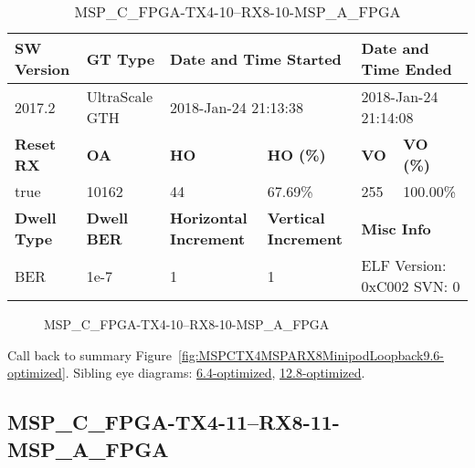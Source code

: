 \begin{table}[h]
\centering
\caption{MSP\_C\_FPGA-TX4-10--RX8-10-MSP\_A\_FPGA}
\label{tab:MSPCFPGATX410RX810MSPAFPGA9.6-optimized}
\begin{tabular}{@{}|l|l|l|l|l|l|@{}}
\toprule
\textbf{SW Version}                & \textbf{GT Type}   & \multicolumn{2}{l|}{\textbf{Date and Time Started}}            & \multicolumn{2}{l|}{\textbf{Date and Time Ended}}        \\ \midrule
2017.2                       & UltraScale GTH          & \multicolumn{2}{l|}{2018-Jan-24 21:13:38}                   & \multicolumn{2}{l|}{2018-Jan-24 21:14:08}               \\ \midrule
\textbf{Reset RX}                  & \textbf{OA} & \textbf{HO}   & \textbf{HO (\%)} & \textbf{VO} & \textbf{VO (\%)} \\ \midrule
true & 10162        & 44          & 67.69\%        & 255        & 100.00\%       \\ \midrule
\textbf{Dwell Type}                & \textbf{Dwell BER} & \textbf{Horizontal Increment} & \textbf{Vertical Increment}    & \multicolumn{2}{l|}{\textbf{Misc Info}}                  \\ \midrule
BER                            & 1e-7        & 1        & 1           & \multicolumn{2}{l|}{ELF Version: 0xC002 SVN: 0}                         \\ \bottomrule
\end{tabular}
\end{table}

\begin{figure}[h]
\caption{MSP\_C\_FPGA-TX4-10--RX8-10-MSP\_A\_FPGA} \label{fig:MSPCFPGATX410RX810MSPAFPGA9.6-optimized}
\end{figure}

Call back to summary Figure~\ref{fig:MSPCTX4MSPARX8MinipodLoopback9.6-optimized}.
Sibling eye diagrams: \hyperref[sec:MSPCFPGATX410RX810MSPAFPGA6.4-optimized]{6.4-optimized}, \hyperref[sec:MSPCFPGATX410RX810MSPAFPGA12.8-optimized]{12.8-optimized}.

\clearpage
\newpage


\subsection{MSP\_C\_FPGA-TX4-11--RX8-11-MSP\_A\_FPGA}\label{sec:MSPCFPGATX411RX811MSPAFPGA9.6-optimized}

